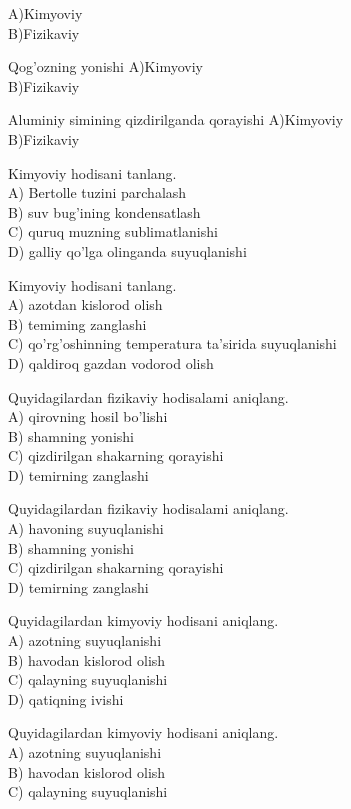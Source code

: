 A)Kimyoviy\\
B)Fizikaviy\\
  \item Qog'ozning yonishi
A)Kimyoviy\\
B)Fizikaviy\\
  \item Aluminiy simining qizdirilganda qorayishi
A)Kimyoviy\\
B)Fizikaviy\\
  \item Kimyoviy hodisani tanlang.\\
A) Bertolle tuzini parchalash\\
B) suv bug'ining kondensatlash\\
C) quruq muzning sublimatlanishi\\
D) galliy qo'lga olinganda suyuqlanishi
  \item Kimyoviy hodisani tanlang.\\
A) azotdan kislorod olish\\
B) temiming zanglashi\\
C) qo'rg'oshinning temperatura ta'sirida suyuqlanishi\\
D) qaldiroq gazdan vodorod olish
  \item Quyidagilardan fizikaviy hodisalami aniqlang.\\
A) qirovning hosil bo'lishi\\
B) shamning yonishi\\
C) qizdirilgan shakarning qorayishi\\
D) temirning zanglashi
  \item Quyidagilardan fizikaviy hodisalami aniqlang.\\
A) havoning suyuqlanishi\\
B) shamning yonishi\\
C) qizdirilgan shakarning qorayishi\\
D) temirning zanglashi
  \item Quyidagilardan kimyoviy hodisani aniqlang.\\
A) azotning suyuqlanishi\\
B) havodan kislorod olish\\
C) qalayning suyuqlanishi\\
D) qatiqning ivishi
  \item Quyidagilardan kimyoviy hodisani aniqlang.\\
A) azotning suyuqlanishi\\
B) havodan kislorod olish\\
C) qalayning suyuqlanishi\\
